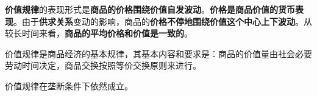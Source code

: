 \textbf{{价值规律}}的表现形式是\textbf{商品的价格围绕价值自发波动}。\textbf{价格是商品价值的货币表现}。由于\textbf{供求关系}变动的影响，商品的\textbf{价格不停地围绕价值这个中心上下波动}。从较长时间来看，\textbf{商品的平均价格和价值是一致的}。

价值规律是商品经济的基本规律，其基本内容和要求是：商品的价值量由社会必要劳动时间决定，商品交换按照等价交换原则来进行。

价值规律在垄断条件下依然成立。
